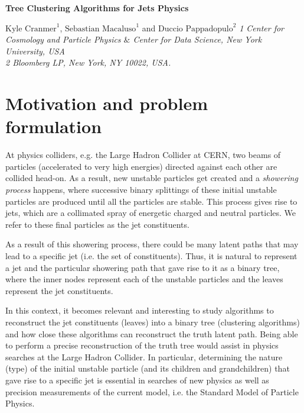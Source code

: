 \documentclass[12pt]{article}
\begin{document}
%


\begin{center}

\vskip 1cm
{\Large \bf  Tree Clustering Algorithms for Jets Physics}

\vskip 1.0cm
{\large $\text{Kyle Cranmer}^1$, $\text{Sebastian Macaluso}^1$ and $\text{Duccio Pappadopulo}^2$}
\vskip 0.6cm
{\small \it 1 Center for Cosmology and Particle Physics $\&$ Center for Data Science, New York University, USA} \\
{\small \it 2 Bloomberg LP, New York, NY 10022, USA.}
\vskip 2.0cm

\end{center}




\section{Motivation and problem formulation}
 
 
At physics colliders, e.g. the Large Hadron Collider at CERN, two beams of particles (accelerated to very high energies) directed against each other are collided head-on. As a result, new unstable particles get created and a {\it showering process} happens, where successive binary splittings of these initial unstable particles are produced until all the particles are stable. This process gives rise to jets, which are a collimated spray of energetic charged and neutral particles. We refer to these final particles as the jet constituents.
 
 As a result of this showering process, there could be many latent paths that may lead to a specific jet (i.e. the set of constituents). Thus, it is natural to represent a jet and the particular showering path that gave rise to it as a binary tree, where the inner nodes represent each of the unstable particles and the leaves represent the jet constituents.   
 
 In this context, it becomes relevant and interesting to study algorithms to reconstruct the jet constituents (leaves) into a binary tree (clustering algorithms) and how close these algorithms can reconstruct the truth latent path. Being able to perform a precise reconstruction of the truth tree would assist in physics searches at the Large Hadron Collider. In particular, determining the nature (type) of the initial unstable particle (and its children and grandchildren) that gave rise to a specific jet is essential in searches of new physics as well as precision measurements of the current model, i.e. the Standard Model of Particle Physics.
 
\end{document}
